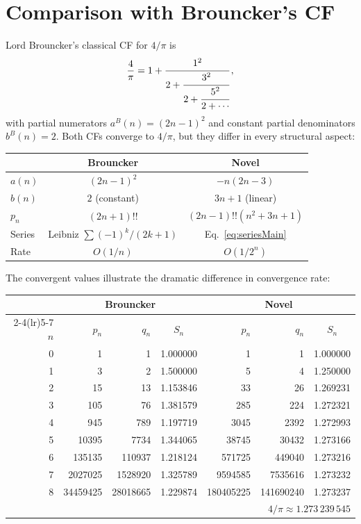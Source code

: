 \documentclass[11pt]{article}
\newcommand{\dff}[1]{(#1)!!}
\theoremstyle{remark}
\begin{document}
\section{Comparison with Brouncker's CF}\label{sec:brouncker}

Lord Brouncker's classical CF for $4/\pi$ is
\[
  \frac{4}{\pi}
  = 1 + \cfrac{1^2}{2 + \cfrac{3^2}{2 + \cfrac{5^2}{2 + \cdots}}}\,,
\]
with partial numerators $a^B(n) = (2n{-}1)^2$ and constant partial
denominators $b^B(n) = 2$.  Both CFs converge to $4/\pi$, but they
differ in every structural aspect:

\begin{center}
\begin{tabular}{@{}lcc@{}}
  \toprule
  & \textbf{Brouncker} & \textbf{Novel} \\
  \midrule
  $a(n)$ & $(2n{-}1)^2$ & $-n(2n{-}3)$ \\
  $b(n)$ & $2$ (constant) & $3n{+}1$ (linear) \\
  $p_n$ & $(2n{+}1)!!$ & $\dff{2n{-}1}(n^2{+}3n{+}1)$ \\
  Series & Leibniz $\sum (-1)^k/(2k{+}1)$ & Eq.~\eqref{eq:seriesMain} \\
  Rate & $O(1/n)$ & $O(1/2^n)$ \\
  \bottomrule
\end{tabular}
\end{center}

The convergent values illustrate the dramatic difference in convergence
rate:
\begin{center}
\small
\begin{tabular}{@{}rrrcrrc@{}}
  \toprule
  & \multicolumn{3}{c}{\textbf{Brouncker}} & \multicolumn{3}{c}{\textbf{Novel}} \\
  \cmidrule(lr){2-4}\cmidrule(lr){5-7}
  $n$ & $p_n$ & $q_n$ & $S_n$ & $p_n$ & $q_n$ & $S_n$ \\
  \midrule
  0 & 1 & 1 & 1.000000 & 1 & 1 & 1.000000 \\
  1 & 3 & 2 & 1.500000 & 5 & 4 & 1.250000 \\
  2 & 15 & 13 & 1.153846 & 33 & 26 & 1.269231 \\
  3 & 105 & 76 & 1.381579 & 285 & 224 & 1.272321 \\
  4 & 945 & 789 & 1.197719 & 3045 & 2392 & 1.272993 \\
  5 & 10395 & 7734 & 1.344065 & 38745 & 30432 & 1.273166 \\
  6 & 135135 & 110937 & 1.218124 & 571725 & 449040 & 1.273216 \\
  7 & 2027025 & 1528920 & 1.325789 & 9594585 & 7535616 & 1.273232 \\
  8 & 34459425 & 28018665 & 1.229874 & 180405225 & 141690240 & 1.273237 \\
  \bottomrule
  \multicolumn{7}{r}{$4/\pi \approx 1.273\,239\,545$}
\end{tabular}
\end{center}
\end{document}
